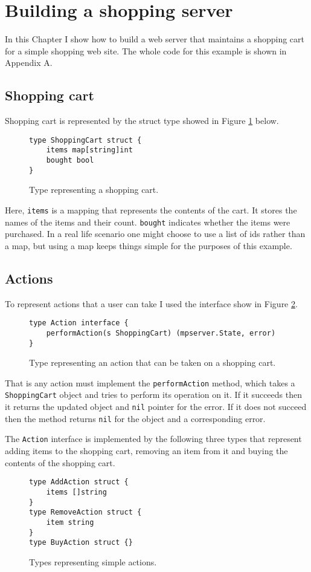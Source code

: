 \section{Building a shopping server}
\label{sec:shopping}
In this Chapter I show how to build a web server that
maintains a shopping cart for a simple shopping web site. The whole 
code for this example is shown in Appendix A.

\subsection{Shopping cart}
Shopping cart is represented by the struct type showed in Figure 
\ref{fig:shoppingCart} below.
\begin{figure}[h]
\begin{lstlisting}
type ShoppingCart struct {
    items map[string]int
    bought bool
}
\end{lstlisting}
\caption[scale=1.0]{Type representing a shopping cart.}
\label{fig:shoppingCart}
\end{figure}

Here, \texttt{items} is 
a mapping that represents the contents of the cart. It stores the names
of the items and their count. \texttt{bought} indicates whether the items
were purchased. In a real life scenario one might choose to use 
a list of ids rather than a map, but using a map keeps things simple
for the purposes of this example.

\subsection{Actions}
To represent actions that a user can take I used the interface show in 
Figure \ref{fig:action}.
\begin{figure}[h]
\begin{lstlisting}
type Action interface {
    performAction(s ShoppingCart) (mpserver.State, error)
}
\end{lstlisting}
\caption[scale=1.0]{Type representing an action that can be taken on 
a shopping cart.}
\label{fig:action}
\end{figure}
That is any action must implement the \texttt{performAction} method, which takes
a \texttt{ShoppingCart} object and tries to perform its operation on it. If
it succeeds then it returns the updated object and \texttt{nil} pointer for the
error. If it does not succeed then the method returns \texttt{nil} for the
object and a corresponding error.

The \texttt{Action} interface is implemented by the following three types
that represent adding items to the shopping cart, removing an item from it
and buying the contents of the shopping cart.
\begin{figure}[h]
\begin{lstlisting}
type AddAction struct {
    items []string
}
type RemoveAction struct {
    item string
}
type BuyAction struct {}
\end{lstlisting}
\caption[scale=1.0]{Types representing simple actions.}
\label{fig:actions}
\end{figure}

